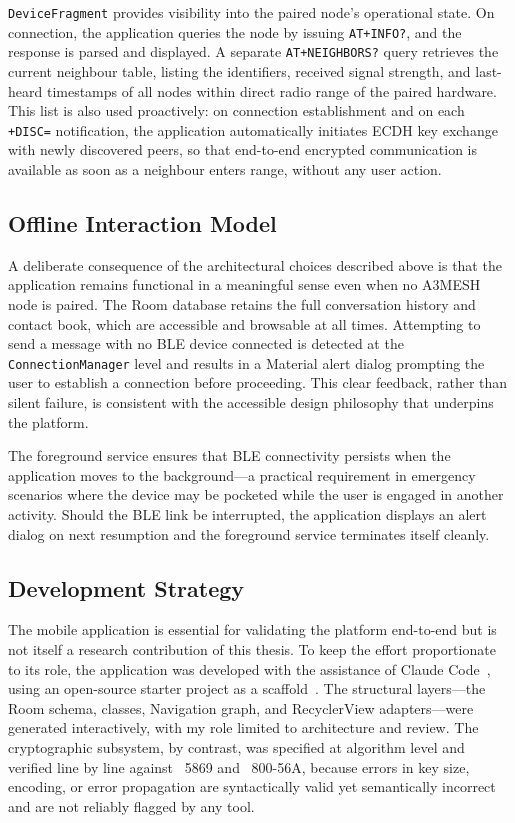 \documentclass[english,bachelor]{tfgitic}[2026/01/22]
\begin{document}
\texttt{DeviceFragment} provides visibility into the paired node's operational state. On connection, the application queries the node by issuing \texttt{AT+INFO?}, and the response is parsed and displayed. A separate \texttt{AT+NEIGHBORS?} query retrieves the current neighbour table, listing the identifiers, received signal strength, and last-heard timestamps of all nodes within direct radio range of the paired hardware. This list is also used proactively: on connection establishment and on each \texttt{+DISC=} notification, the application automatically initiates ECDH key exchange with newly discovered peers, so that end-to-end encrypted communication is available as soon as a neighbour enters range, without any user action.

\subsection{Offline Interaction Model}

A deliberate consequence of the architectural choices described above is that the application remains functional in a meaningful sense even when no A3MESH node is paired. The Room database retains the full conversation history and contact book, which are accessible and browsable at all times. Attempting to send a message with no BLE device connected is detected at the \texttt{ConnectionManager} level and results in a Material alert dialog prompting the user to establish a connection before proceeding. This clear feedback, rather than silent failure, is consistent with the accessible design philosophy that underpins the platform.

The foreground service ensures that BLE connectivity persists when the application moves to the background---a practical requirement in emergency scenarios where the device may be pocketed while the user is engaged in another activity. Should the BLE link be interrupted, the application displays an alert dialog on next resumption and the foreground service terminates itself cleanly.

\subsection{Development Strategy}

The mobile application is essential for validating the platform end-to-end but is not itself a research contribution of this thesis. To keep the effort proportionate to its role, the application was developed with the assistance of Claude Code~\cite{dakhel2023copilot}, using an open-source  starter project as a scaffold~\cite{punchthroughble2024}. The structural layers---the Room schema,  classes, Navigation graph, and RecyclerView adapters---were generated interactively, with my role limited to architecture and review. The cryptographic subsystem, by contrast, was specified at algorithm level and verified line by line against ~5869 and  ~800-56A, because errors in key size, encoding, or error propagation are syntactically valid yet semantically incorrect and are not reliably flagged by any tool.
\end{document}
